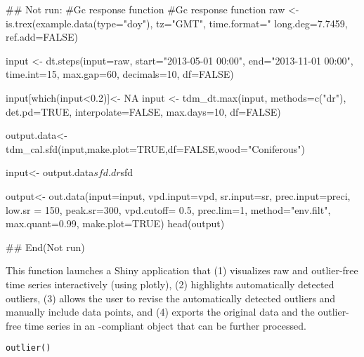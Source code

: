 \documentclass[a4paper]{book}
\begin{document}
%
\begin{Examples}
\begin{ExampleCode}
## Not run: 
#Gc response function
#Gc response function
raw   <- is.trex(example.data(type="doy"), tz="GMT",
                 time.format="%
                 long.deg=7.7459, ref.add=FALSE)

input <- dt.steps(input=raw, start="2013-05-01 00:00", end="2013-11-01 00:00",
                   time.int=15, max.gap=60, decimals=10, df=FALSE)

input[which(input<0.2)]<- NA
input <- tdm_dt.max(input, methods=c("dr"), det.pd=TRUE, interpolate=FALSE,
                 max.days=10, df=FALSE)

output.data<- tdm_cal.sfd(input,make.plot=TRUE,df=FALSE,wood="Coniferous")

input<- output.data$sfd.dr$sfd

output<- out.data(input=input, vpd.input=vpd, sr.input=sr, prec.input=preci,
                  low.sr = 150, peak.sr=300, vpd.cutoff= 0.5, prec.lim=1,
                  method="env.filt", max.quant=0.99, make.plot=TRUE)
head(output)


## End(Not run)

\end{ExampleCode}
\end{Examples}
%
\begin{Description}\relax
This function launches a Shiny application that
(1) visualizes raw and outlier-free time series interactively
(using plotly),
(2) highlights automatically detected outliers,
(3) allows the user to revise the automatically detected outliers
and manually include data points, and
(4) exports the original data and the outlier-free time series in
an -compliant object that can be further processed.
\end{Description}
%
\begin{Usage}
\begin{verbatim}
outlier()
\end{verbatim}
\end{Usage}
%
\end{document}
